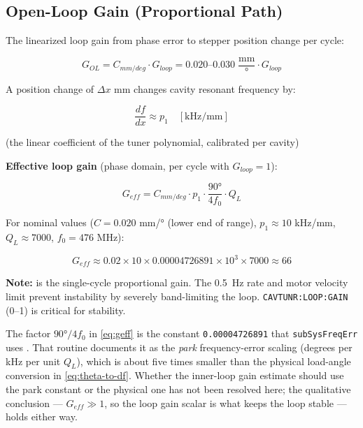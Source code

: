\subsection{Open-Loop Gain (Proportional Path)}\label{sec:open-loop-gain}


The linearized loop gain from phase error to stepper position change per cycle:

\begin{equation}\label{eq:gol}
  G_{OL} = C_{mm/deg} \cdot G_{loop} = 0.020\text{–0.030} \; \frac{\text{mm}}{\text{°}} \cdot G_{loop}
\end{equation}

A position change of \(\Delta x\) mm changes cavity resonant frequency by:

\begin{equation}\label{eq:dfdx}
  \frac{df}{dx} \approx p_1 \quad [\text{kHz/mm}]
\end{equation}

(the linear coefficient of the tuner polynomial, calibrated per cavity)

\textbf{Effective loop gain} (phase domain, per cycle with \(G_{loop}=1\)):

\begin{equation}\label{eq:geff}
  G_{eff} = C_{mm/deg} \cdot p_1 \cdot \frac{90°}{4 f_0} \cdot Q_L
\end{equation}

For nominal values (\(C = 0.020\) mm/° (lower end of range), \(p_1 \approx 10\) kHz/mm, \(Q_L \approx 7000\), \(f_0 = 476\) MHz):

\begin{equation}\label{eq:geff-num}
  G_{eff} \approx 0.02 \times 10 \times 0.00004726891 \times 10^3 \times 7000 \approx 66
\end{equation}

\begin{keynote}
\textbf{Note:}  is the single-cycle proportional gain. The \qty{0.5}{\hertz} rate and motor velocity limit prevent instability by severely band-limiting the loop. \texttt{CAVTUNR:\allowbreak{}LOOP:\allowbreak{}GAIN} (0--1) is critical for stability.

The factor \(90°/4f_0\) in \cref{eq:geff} is the constant \texttt{0.00004726891} that \texttt{subSysFreqErr} uses . That routine documents it as the \emph{park} frequency-error scaling (degrees per kHz per unit \(Q_L\)), which is about five times smaller than the physical load-angle conversion in \cref{eq:theta-to-df}. Whether the inner-loop gain estimate should use the park constant or the physical one has not been resolved here; the qualitative conclusion --- \(G_{eff} \gg 1\), so the loop gain scalar is what keeps the loop stable --- holds either way.
\end{keynote}

